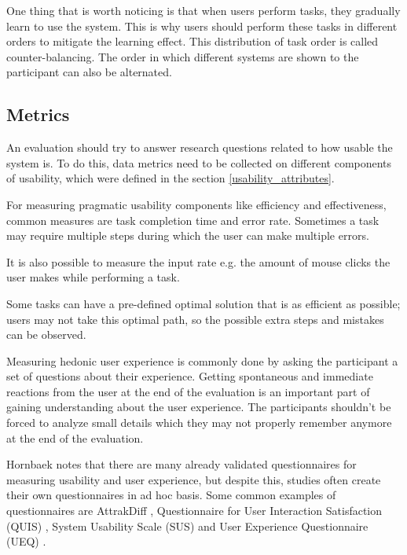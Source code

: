 One thing that is worth noticing is that when users perform tasks, they gradually learn to use the system. This is why users should perform these tasks in different orders to mitigate the learning effect. This distribution of task order is called counter-balancing. The order in which different systems are shown to the participant can also be alternated. \cite{rubin2008handbook}

\subsection{Metrics}
An evaluation should try to answer research questions related to how usable the system is. To do this, data metrics need to be collected on different components of usability, which were defined in the section \ref{usability_attributes}.

For measuring pragmatic usability components like efficiency and effectiveness, common measures are task completion time and error rate. Sometimes a task may require multiple steps during which the user can make multiple errors. 

It is also possible to measure the input rate e.g. the amount of mouse clicks the user makes while performing a task.

Some tasks can have a pre-defined optimal solution that is as efficient as possible; users may not take this optimal path, so the possible extra steps and mistakes can be observed. \cite{hornbaek2006current}

Measuring hedonic user experience is commonly done by asking the participant a set of questions about their experience. Getting spontaneous and immediate reactions from the user at the end of the evaluation is an important part of gaining understanding about the user experience. The participants shouldn't be forced to analyze small details which they may not properly remember anymore at the end of the evaluation. \cite{laugwitz2008construction}

Hornbaek \cite{hornbaek2006current} notes that there are many already validated questionnaires for measuring usability and user experience, but despite this, studies often create their own questionnaires in ad hoc basis. Some common examples of questionnaires are AttrakDiff \cite{hassenzahl2003attrakdiff}, Questionnaire for User Interaction Satisfaction (QUIS) \cite{chin1988questionnaire}, System Usability Scale (SUS) \cite{brooke1996sus} and User Experience Questionnaire (UEQ) \cite{laugwitz2008construction}.

